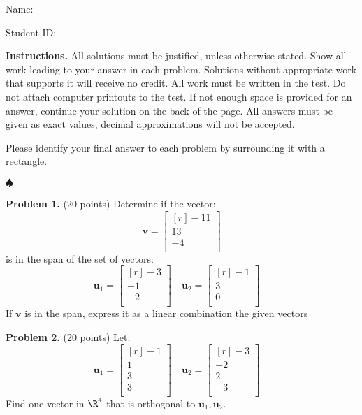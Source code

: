 \documentclass[12pt]{article}
\begin{document}
Name: \hrulefill

\bigskip
Student ID: \hrulefill

\bigskip
\textbf{Instructions.} All solutions must be justified, unless otherwise stated. Show all work leading to your answer in each problem. Solutions without appropriate work that supports it will receive no credit. All work must be written in the test. Do not attach computer printouts to the test. If not enough space is provided for an answer, continue your solution on the back of the page. All answers must be given as exact values, decimal approximations will not be accepted.

Please identify your final answer to each problem by surrounding it with a rectangle.

\vfill
\hfill$\spadesuit$

\clearpage

\textbf{Problem 1.} (20 points)
Determine if the vector:
\[
\mathbf{v}=\begin{bmatrix*}[r]-11\\ 13\\ -4\\ \end{bmatrix*}
\]
is in the span of the set of vectors:
\[
\mathbf{u}_1=\begin{bmatrix*}[r]-3\\ -1\\ -2\\ \end{bmatrix*}\quad
\mathbf{u}_2=\begin{bmatrix*}[r]-1\\ 3\\ 0\\ \end{bmatrix*}\quad
\]
If $\mathbf{v}$ is in the span, 
express it as a linear combination the given vectors



\clearpage


\textbf{Problem 2.} (20 points) 
Let:
\[\mathbf{u}_1=\begin{bmatrix*}[r]-1\\ 1\\ 3\\ 3\\ \end{bmatrix*}\quad
\mathbf{u}_2=\begin{bmatrix*}[r]-3\\ -2\\ 2\\ -3\\ \end{bmatrix*}\quad
\]
Find one vector in $\R^{4}$ that is orthogonal to $\textbf{u}_1, \textbf{u}_2$.
\end{document}
